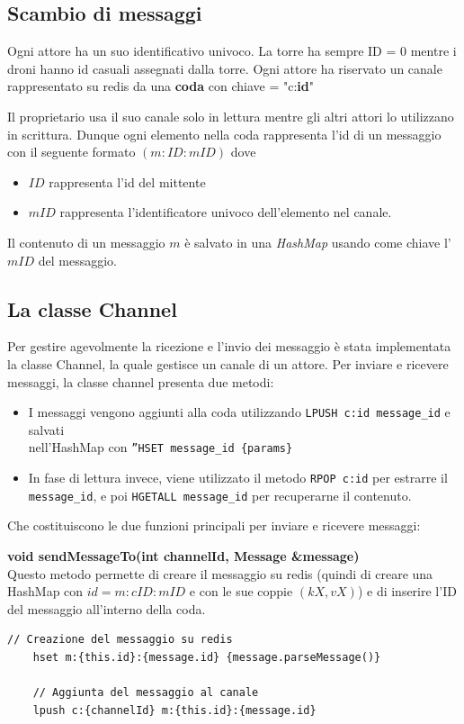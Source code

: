 \documentclass[a4paper, 11pt]{article}
\begin{document}
\subsection{Scambio di messaggi}

Ogni attore ha un suo identificativo univoco. La torre ha sempre ID = 0 mentre i droni hanno id casuali assegnati dalla torre. 
Ogni attore ha riservato un canale rappresentato su redis da una \textbf{coda} con chiave = "c:\textbf{id}"

Il proprietario usa il suo canale solo in lettura mentre gli altri attori lo utilizzano in scrittura.
Dunque ogni elemento nella coda rappresenta l'id di un messaggio con il seguente formato $(m:ID:mID)$ dove
\begin{itemize}
    \item $ID$ rappresenta l'id del mittente
    \item $mID$ rappresenta l'identificatore univoco dell'elemento nel canale.
\end{itemize}
Il contenuto di un messaggio $m$ è salvato in una \textit{HashMap} usando come chiave l'$mID$ del messaggio.
\subsection{La classe Channel}
Per gestire agevolmente la ricezione e l'invio dei messaggio è stata implementata la classe Channel, la quale gestisce un canale di un attore. Per inviare e ricevere messaggi, la classe channel presenta due metodi:
\begin{itemize}
    \item I messaggi vengono aggiunti alla coda utilizzando \verb|LPUSH c:id message_id| e salvati \\nell'HashMap con \verb|”HSET message_id {params}|
    \item In fase di lettura invece, viene utilizzato il metodo \verb|RPOP c:id| per estrarre il \verb|message_id|, e poi \verb|HGETALL message_id| per recuperarne il contenuto.
\end{itemize}
Che costituiscono le due funzioni principali per inviare e ricevere messaggi:

\textbf{void sendMessageTo(int channelId, Message \&message)}\\
Questo metodo permette di creare il messaggio su redis (quindi di creare una HashMap con $id = m:cID:mID$ e con le sue coppie $(kX,vX)$)
e di inserire l'ID del messaggio all'interno della coda.
\begin{lstlisting}[style=customcpp]
    // Creazione del messaggio su redis
    hset m:{this.id}:{message.id} {message.parseMessage()}
    
    // Aggiunta del messaggio al canale
    lpush c:{channelId} m:{this.id}:{message.id} 
\end{lstlisting}
\end{document}
